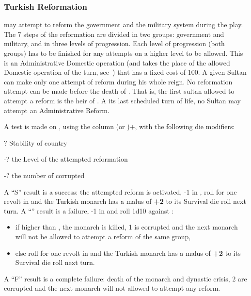 \subsubsection{Turkish Reformation}
\label{chSpecific:Turkey:Reform}
 \TUR may attempt to reform the
government and the military system during the play.  The 7 steps of the
reformation are divided in two groups: government and military, and in
three levels of progression. Each level of progression (both groups) has
to be finished for any attempts on a higher level to be allowed.
\bparag This is an Administrative Domestic operation (and takes the
place of the allowed Domestic operation of the turn,
see~) that has a fixed
cost of 100\ducats.
\bparag A given Sultan can make only one attempt of reform during his
whole reign.
\bparag No reformation attempt can be made before the death of
. That is, the first sultan allowed to attempt a
reform is the heir of .
\bparag A its last scheduled turn of life, no Sultan may attempt an
Administrative Reform.

\aparag A test is made on ,
using the column (\MIL or \ADM)+, with the following die
modifiers:
\begin{modlist}
\item[\textpm?] Stability of country
\item[-?] the Level of the attempted reformation
\item[-?]  the number of corrupted \Pashas
\end{modlist}
\bparag A ``S'' result is a success: the attempted reform is activated,
-1 in \STAB, roll for one revolt in \TUR and the Turkish monarch has a
malus of {\bf +2} to its Survival die roll next turn.
\bparag A ``\undemi'' result is a failure, -1 in \STAB and roll 1d10
against \FTI:
\begin{itemize}
\item if higher than \FTI, the monarch is killed, 1 \Pasha is corrupted
  and the next monarch will not be allowed to attempt a reform of the
  same group,
\item else roll for one revolt in \TUR and the Turkish monarch has a
  malus of {\bf +2} to its Survival die roll next turn.
\end{itemize}
\bparag A ``F'' result is a complete failure: death of the monarch and
dynastic crisis, 2 \Pashas are corrupted and the next monarch will not
allowed to attempt any reform.

